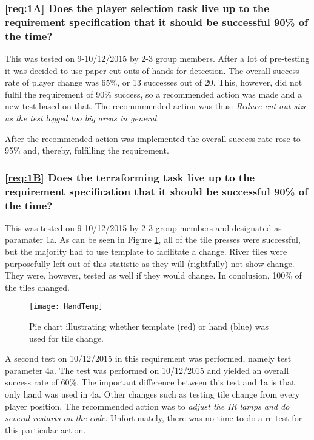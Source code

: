 	\subsubsection*{\ref{req:1A} Does the player selection task live up to the requirement specification that it should be successful 90\% of the time?}
This was tested on 9-10/12/2015 by 2-3 group members. After a lot of pre-testing it was decided to use paper cut-outs of hands for detection. The overall success rate of player change was 65\%, or 13 successes out of 20. This, however, did not fulfil the requirement of 90\% success, so a recommended action was made and a new test based on that.
The recommmended action was thus: \textit{Reduce cut-out size as the test logged too big areas in general.}

After the recommended action was implemented the overall success rate rose to 95\% and, thereby, fulfilling the requirement.

	\subsubsection*{\ref{req:1B} Does the terraforming task live up to the requirement specification that it should be successful 90\% of the time?}
	This was tested on 9-10/12/2015 by 2-3 group members and designated as paramater 1a. As can be seen in Figure \ref{fig:techHandTemp}, all of the tile presses were successful, but the majority had to use template to facilitate a change. River tiles were purposefully left out of this statistic as they will (rightfully) not show change. They were, however, tested as well if they would change. In conclusion, 100\% of the tiles changed.
	
\begin{figure}[h!]
	\centering
	\texttt{[image: HandTemp]}
	\caption{Pie chart illustrating whether template (red) or hand (blue) was used for tile change.} 
	\label{fig:techHandTemp}
\end{figure}
	
	A second test on 10/12/2015 in this requirement was performed, namely test parameter 4a. The test was performed on 10/12/2015 and yielded an overall success rate of 60\%. The important difference between this test and 1a is that only hand was used in 4a. Other changes such as testing tile change from every player position. The recommended action was to \textit{adjust the IR lamps and do several restarts on the code}. Unfortunately, there was no time to do a re-test for this particular action.
	
